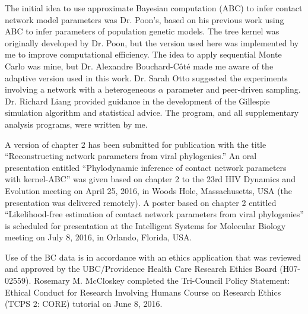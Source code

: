 The initial idea to use approximate Bayesian computation (ABC) to infer contact
network model parameters was Dr. Poon's, based on his previous work using ABC
to infer parameters of population genetic models. The tree kernel was
originally developed by Dr. Poon, but the version used here was implemented by
me to improve computational efficiency. The idea to apply sequential Monte
Carlo was mine, but Dr. Alexandre Bouchard-C\^ot\'e made me aware of the
adaptive version used in this work. Dr. Sarah Otto suggested the experiments
involving a network with a heterogeneous $\alpha$ parameter and peer-driven
sampling. Dr. Richard Liang provided guidance in the development of the
Gillespie simulation algorithm and statistical advice. The 
program, and all supplementary analysis programs, were written by me.

A version of chapter 2 has been submitted for publication with the title
``Reconstructing network parameters from viral phylogenies.'' An oral
presentation entitled ``Phylodynamic inference of contact network parameters
with kernel-ABC'' was given based on chapter 2 to the 23rd HIV Dynamics and
Evolution meeting on April 25, 2016, in Woods Hole, Massachusetts, USA (the
presentation was delivered remotely). A poster based on chapter 2 entitled
``Likelihood-free estimation of contact network parameters from viral
phylogenies'' is scheduled for presentation at the Intelligent Systems for
Molecular Biology meeting on July 8, 2016, in Orlando, Florida, USA.

Use of the BC data is in accordance with an ethics application that was
reviewed and approved by the UBC/Providence Health Care Research Ethics Board
(H07-02559). Rosemary M. McCloskey completed the Tri-Council Policy Statement:
Ethical Conduct for Research Involving Humans Course on Research Ethics (TCPS
2: CORE) tutorial on June 8, 2016.

